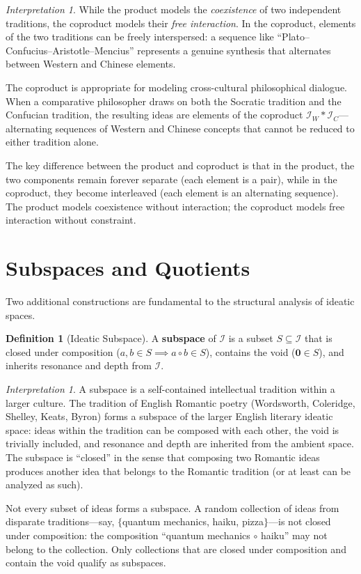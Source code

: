 \documentclass[11pt,openany]{book}
\theoremstyle{definition}
\newtheorem{definition}[axiom]{Definition}
\theoremstyle{plain}
\theoremstyle{remark}
\newtheorem{interpretation}[axiom]{Interpretation}
\newcommand{\IS}{\mathcal{I}}               %
\newcommand{\compose}{\circ}                 %
\newcommand{\void}{\mathbf{0}}              %
\begin{document}
\begin{interpretation}
While the product models the \emph{coexistence} of two independent traditions, the coproduct models their \emph{free interaction}. In the coproduct, elements of the two traditions can be freely interspersed: a sequence like ``Plato--Confucius--Aristotle--Mencius'' represents a genuine synthesis that alternates between Western and Chinese elements.

The coproduct is appropriate for modeling cross-cultural philosophical dialogue. When a comparative philosopher draws on both the Socratic tradition and the Confucian tradition, the resulting ideas are elements of the coproduct $\IS_W * \IS_C$---alternating sequences of Western and Chinese concepts that cannot be reduced to either tradition alone.

The key difference between the product and coproduct is that in the product, the two components remain forever separate (each element is a pair), while in the coproduct, they become interleaved (each element is an alternating sequence). The product models coexistence without interaction; the coproduct models free interaction without constraint.
\end{interpretation}

\section{Subspaces and Quotients}

Two additional constructions are fundamental to the structural analysis of ideatic spaces.

\begin{definition}[Ideatic Subspace]
A \textbf{subspace} of $\IS$ is a subset $S \subseteq \IS$ that is closed under composition ($a, b \in S \implies a \compose b \in S$), contains the void ($\void \in S$), and inherits resonance and depth from $\IS$.
\end{definition}

\begin{interpretation}
A subspace is a self-contained intellectual tradition within a larger culture. The tradition of English Romantic poetry (Wordsworth, Coleridge, Shelley, Keats, Byron) forms a subspace of the larger English literary ideatic space: ideas within the tradition can be composed with each other, the void is trivially included, and resonance and depth are inherited from the ambient space. The subspace is ``closed'' in the sense that composing two Romantic ideas produces another idea that belongs to the Romantic tradition (or at least can be analyzed as such).

Not every subset of ideas forms a subspace. A random collection of ideas from disparate traditions---say, $\{$quantum mechanics, haiku, pizza$\}$---is not closed under composition: the composition ``quantum mechanics $\compose$ haiku'' may not belong to the collection. Only collections that are closed under composition and contain the void qualify as subspaces.
\end{interpretation}
\end{document}
